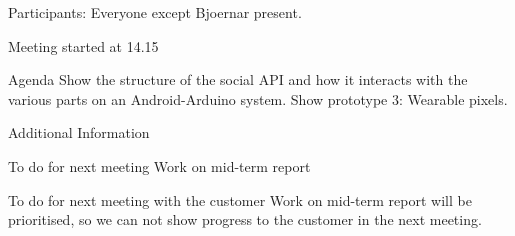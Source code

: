Participants: Everyone except Bjoernar present.


Meeting started at 14.15




Agenda
Show the structure of the social API and how it interacts with the various parts on an Android-Arduino system.
Show prototype 3: Wearable pixels.




Additional Information








To do for next meeting
Work on mid-term report


To do for next meeting with the customer
Work on mid-term report will be prioritised, so we can not show progress to the customer in the next meeting.